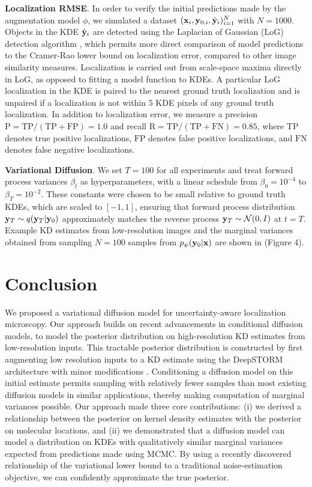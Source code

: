 \textbf{Localization RMSE}. In order to verify the initial predictions made by the augmentation model $\phi$, we simulated a dataset $(\bold{x}_i,\bold{y}_{0,i},\hat{\bold{y}}_{i})_{i=1}^{N}$ with $N=1000$. Objects in the KDE $\hat{\bold{y}}_{i}$  are detected using the Laplacian of Gaussian (LoG) detection algorithm \parencite{Kong2013}, which permits more direct comparison of model predictions to the Cramer-Rao lower bound on localization error, compared to other image similarity measures. Localization is carried out from scale-space maxima directly in LoG, as opposed to fitting a model function to KDEs. A particular LoG localization in the KDE is paired to the nearest ground truth localization and is unpaired if a localization is not within 5 KDE pixels of any ground truth localization. In addition to localization error, we measure a precision $\mathrm{P = TP/(TP + FP)} = 1.0$ and recall $\mathrm{R = TP/(TP + FN)} = 0.85$, where $\mathrm{TP}$ denotes true positive localizations, $\mathrm{FP}$ denotes false positive localizations, and $\mathrm{FN}$ denotes false negative localizations.


\textbf{Variational Diffusion}. We set $T = 100$ for all experiments and treat forward process variances $\beta_{t}$ as hyperparameters, with a linear schedule from $\beta_{0}=10^{-4}$ to $\beta_{T}=10^{-2}$.
These constants were chosen to be small relative to ground truth KDEs, which are scaled to $[-1,1]$, ensuring that forward process distribution $\bold{y}_{T}\sim q(\bold{y}_{T}\lvert\bold{y}_{0})$ approximately matches the reverse process $\bold{y}_T\sim \mathcal{N}(0, I)$ at $t=T$. Example KD estimates from low-resolution images and the marginal variances obtained from sampling $N=100$ samples from $p_{\psi}(\bold{y}_{0}\lvert\bold{x})$ are shown in (Figure 4). 


\section{Conclusion}

We proposed a variational diffusion model for uncertainty-aware localization microscopy. Our approach builds on recent advancements in conditional diffusion models, to model the posterior distribution on high-resolution KD estimates from low-resolution inputs. This tractable posterior distribution is constructed by first augmenting low resolution inputs to a KD estimate using the DeepSTORM architecture with minor modifications \parencite{Nehme2020}. Conditioning a diffusion model on this initial estimate permits sampling with relatively fewer samples than most existing diffusion models in similar applications, thereby making computation of marginal variances possible. Our approach made three core contributions: (i) we derived a relationship between the posterior on kernel density estimates with the posterior on molecular locations, and (ii) we demonstrated that a diffusion model can model a distribution on KDEs with qualitatively similar marginal variances expected from predictions made using MCMC. By using a recently discovered relationship of the variational lower bound to a traditional noise-estimation objective, we can confidently approximate the true posterior.

